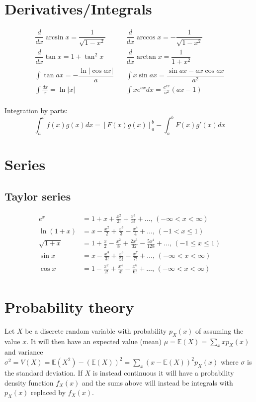 \section{Derivatives/Integrals}
\begin{align*}
\dfrac{d}{dx}\arcsin x = \dfrac{1}{\sqrt{1-x^2}} & \quad
\dfrac{d}{dx}\arccos x = -\dfrac{1}{\sqrt{1-x^2}}\\
\dfrac{d}{dx}\tan x = 1+\tan^2 x & \quad
\dfrac{d}{dx}\arctan x = \dfrac{1}{1+x^2}\\
\int\tan ax = -\dfrac{\ln|\cos ax|}{a} & \quad
\int x\sin ax = \dfrac{\sin ax-ax \cos ax}{a^2}\\
\int \frac{dx}{x} = \ln|x| & \quad
\int xe^{ax}dx = \frac{e^{ax}}{a^2}(ax-1)\\
\end{align*}

Integration by parts:
\[\int_a^bf(x)g(x)dx = [F(x)g(x)]_a^b-\int_a^bF(x)g'(x)dx\]

\section{Series} 
\subsection{Taylor series}
\begin{align*}
e^x &= 1+x+\frac{x^2}{2!}+\frac{x^3}{3!}+\dots,\,(-\infty<x<\infty)\\
\ln(1+x) &= x-\frac{x^2}{2}+\frac{x^3}{3}-\frac{x^4}{4}+\dots,\,(-1<x\leq1)\\
\sqrt{1+x} &= 1+\frac{x}{2}-\frac{x^2}{8}+\frac{2x^3}{32}-\frac{5x^4}{128}+\dots,\,(-1\leq x\leq1)\\
\sin x &= x-\frac{x^3}{3!}+\frac{x^5}{5!}-\frac{x^7}{7!}+\dots,\,(-\infty<x<\infty)\\
\cos x &= 1-\frac{x^2}{2!}+\frac{x^4}{4!}-\frac{x^6}{6!}+\dots,\,(-\infty<x<\infty)\\
\end{align*}

\section{Probability theory}
Let $X$ be a discrete random variable with probability $p_X(x)$ of assuming the value $x$. It will then have an expected value (mean) $\mu=\mathbb{E}(X)=\sum_xxp_X(x)$ and variance $\sigma^2=V(X)=\mathbb{E}(X^2)-(\mathbb{E}(X))^2=\sum_x(x-\mathbb{E}(X))^2p_X(x)$ where $\sigma$ is the standard deviation. If $X$ is instead continuous it will have a probability density function $f_X(x)$ and the sums above will instead be integrals with $p_X(x)$ replaced by $f_X(x)$.

